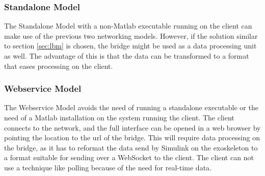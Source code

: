 \subsubsection{Standalone Model}\label{sec:sm}
The Standalone Model with a non-Matlab executable running on the client can make use of the previous two networking models. However, if the solution similar to section \ref{sec:lbm} is chosen, the bridge might be used as a data processing unit as well. The advantage of this is that the data can be transformed to a format that eases processing on the client.

\subsubsection{Webservice Model}\label{sec:wm}
The Webservice Model avoids the need of running a standalone executable or the need of a Matlab installation on the system running the client. The client connects to the network, and the full interface can be opened in a web browser by pointing the location to the url of the bridge. This will require data processing on the bridge, as it has to reformat the data send by Simulink on the exoskeleton to a format suitable for sending over a WebSocket to the client. The client can not use a technique like polling because of the need for real-time data.


